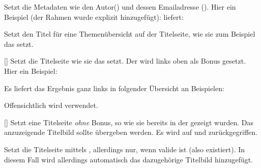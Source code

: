 %
%

Setzt die Metadaten wie den Autor() und dessen Emailadresse (). Hier ein Beispiel (der Rahmen wurde explizit hinzugefügt):  liefert:\smallskip\\
\framebox{\LILLYxPHILOSOPHERxMETADATA}

%
%
%

Setzt den Titel für eine Themenübersicht auf der Titelseite, wie sie zum Beispiel das  setzt.

%
%
%

[\secline{}\secline{}\secline{}]
Setzt die Titelseite wie sie das  setzt. Der  wird links oben als Bonus gesetzt. Hier ein Beispiel:
Es liefert das Ergebnis ganz links in folgender Übersicht an Beispielen:
\begin{tcbraster}[raster columns=4, blankest,graphics pages={10,13,15,16},colback=white]
\end{tcbraster}
Offensichtlich wird  verwendet.

%
%
%

[]
Setzt eine Titelseite \emph{ohne} Bonus, so wie sie bereits in der  gezeigt wurden. Das anzuzeigende Titelbild sollte übergeben werden. Es wird auf  und  zurückgegriffen.

%
%
%

Setzt die Titelseite mittels , allerdings nur, wenn  valide ist (also existiert). In diesem Fall wird allerdings automatisch das dazugehörige Titelbild hinzugefügt.

